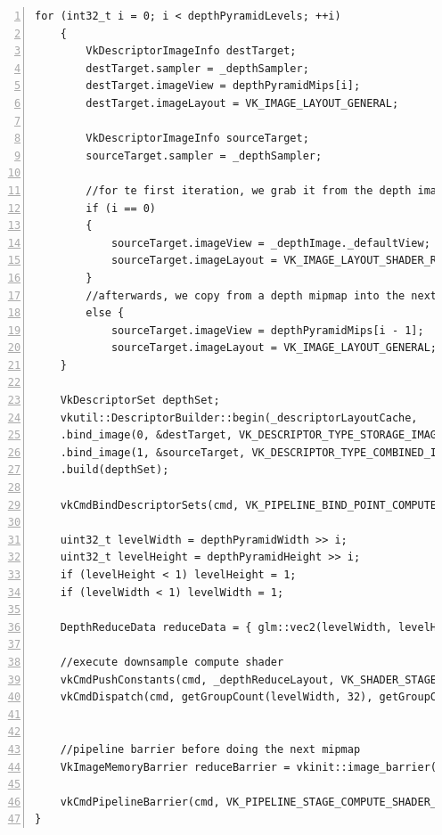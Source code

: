 \documentclass{ctexart}
\begin{document}
\begin{lstlisting}[language={[ANSI]C},keywordstyle=\color{blue!70},commentstyle=\color{red!50!green!50!blue!50},frame=shadowbox, rulesepcolor=\color{red!20!green!20!blue!20},basicstyle=\small,numbers=left, numberstyle=\tiny,breaklines=true]
	for (int32_t i = 0; i < depthPyramidLevels; ++i)
	{
		VkDescriptorImageInfo destTarget;
		destTarget.sampler = _depthSampler;
		destTarget.imageView = depthPyramidMips[i];
		destTarget.imageLayout = VK_IMAGE_LAYOUT_GENERAL;

		VkDescriptorImageInfo sourceTarget;
		sourceTarget.sampler = _depthSampler;

		//for te first iteration, we grab it from the depth image
		if (i == 0)
		{
			sourceTarget.imageView = _depthImage._defaultView;
			sourceTarget.imageLayout = VK_IMAGE_LAYOUT_SHADER_READ_ONLY_OPTIMAL;
		}
		//afterwards, we copy from a depth mipmap into the next
		else {
			sourceTarget.imageView = depthPyramidMips[i - 1];
			sourceTarget.imageLayout = VK_IMAGE_LAYOUT_GENERAL;
	}

	VkDescriptorSet depthSet;
	vkutil::DescriptorBuilder::begin(_descriptorLayoutCache, 	get_current_frame().dynamicDescriptorAllocator)
	.bind_image(0, &destTarget, VK_DESCRIPTOR_TYPE_STORAGE_IMAGE, VK_SHADER_STAGE_COMPUTE_BIT)
	.bind_image(1, &sourceTarget, VK_DESCRIPTOR_TYPE_COMBINED_IMAGE_SAMPLER, VK_SHADER_STAGE_COMPUTE_BIT)
	.build(depthSet);

	vkCmdBindDescriptorSets(cmd, VK_PIPELINE_BIND_POINT_COMPUTE, _depthReduceLayout, 0, 1, &depthSet, 0, nullptr);

	uint32_t levelWidth = depthPyramidWidth >> i;
	uint32_t levelHeight = depthPyramidHeight >> i;
	if (levelHeight < 1) levelHeight = 1;
	if (levelWidth < 1) levelWidth = 1;

	DepthReduceData reduceData = { glm::vec2(levelWidth, levelHeight) };

	//execute downsample compute shader
	vkCmdPushConstants(cmd, _depthReduceLayout, VK_SHADER_STAGE_COMPUTE_BIT, 0, sizeof(reduceData), &reduceData);
	vkCmdDispatch(cmd, getGroupCount(levelWidth, 32), getGroupCount(levelHeight, 32), 1);


	//pipeline barrier before doing the next mipmap
	VkImageMemoryBarrier reduceBarrier = vkinit::image_barrier(_depthPyramid._image, VK_ACCESS_SHADER_WRITE_BIT, VK_ACCESS_SHADER_READ_BIT, VK_IMAGE_LAYOUT_GENERAL, VK_IMAGE_LAYOUT_GENERAL, VK_IMAGE_ASPECT_COLOR_BIT);

	vkCmdPipelineBarrier(cmd, VK_PIPELINE_STAGE_COMPUTE_SHADER_BIT, VK_PIPELINE_STAGE_COMPUTE_SHADER_BIT, VK_DEPENDENCY_BY_REGION_BIT, 0, 0, 0, 0, 1, &reduceBarrier);
}
\end{lstlisting}
\end{document}
